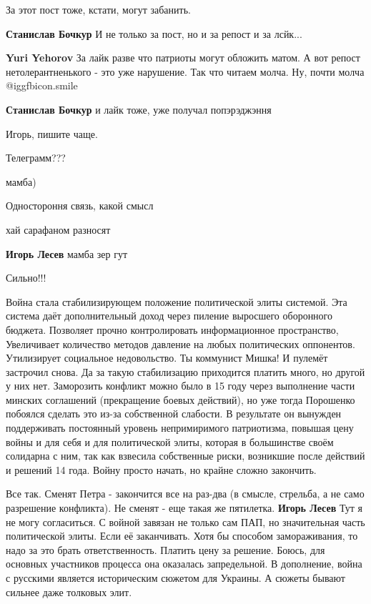 \begin{itemize}
За этот пост тоже, кстати, могут забанить.

\begin{itemize} %
\textbf{Станислав Бочкур} И не только за пост, но и за репост и за лсйк...

\textbf{Yuri Yehorov} За лайк разве что патриоты могут обложить матом. А вот репост нетолерантненького - это уже нарушение. Так что читаем молча. Ну, почти молча  @igg{fbicon.smile} 

\textbf{Станислав Бочкур} и лайк тоже, уже получал попэрэджэння
\end{itemize} %

Игорь, пишите чаще.

Телеграмм???

\begin{itemize} %
мамба)

Одностороння связь, какой смысл

хай сарафаном разносят

\textbf{Игорь Лесев} мамба зер гут
\end{itemize} %

Сильно!!!


Война стала стабилизирующем положение политической элиты системой. Эта система
даёт дополнительный доход через пиление выросшего оборонного бюджета. Позволяет
прочно контролировать информационное пространство, Увеличивает количество
методов давление на любых политических оппонентов. Утилизирует социальное
недовольство. Ты коммунист Мишка! И пулемёт застрочил снова. Да за такую
стабилизацию приходится платить много, но другой у них нет. Заморозить конфликт
можно было в 15 году через выполнение части минских соглашений (прекращение
боевых действий), но уже тогда Порошенко побоялся сделать это из-за собственной
слабости. В результате он вынужден поддерживать постоянный уровень
непримиримого патриотизма, повышая цену войны и для себя и для политической
элиты, которая в большинстве своём солидарна с ним, так как взвесила
собственные риски, возникшие после действий и решений 14 года. Войну просто
начать, но крайне сложно закончить.

\begin{itemize} %
Все так. Сменят Петра - закончится все на раз-два (в смысле, стрельба, а не само разрешение конфликта). Не сменят - еще такая же пятилетка.
\textbf{Игорь Лесев} Тут я не могу согласиться. С войной завязан не только сам ПАП, но значительная часть политической элиты. Если её заканчивать. Хотя бы способом замораживания, то надо за это брать ответственность. Платить цену за решение. Боюсь, для основных участников процесса она оказалась запредельной. В дополнение, война с русскими является историческим сюжетом для Украины. А сюжеты бывают сильнее даже толковых элит.


\end{itemize}
\end{itemize}
